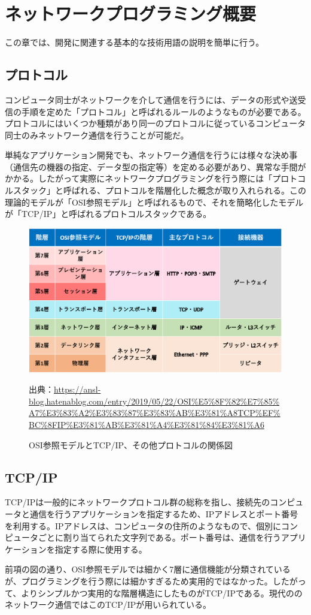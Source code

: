 \documentclass[dvipdfmx]{jsarticle}
\begin{document}
\section{ネットワークプログラミング概要}
この章では、開発に関連する基本的な技術用語の説明を簡単に行う。
\subsection{プロトコル}
コンピュータ同士がネットワークを介して通信を行うには、データの形式や送受信の手順を定めた「プロトコル」と呼ばれるルールのようなものが必要である。プロトコルにはいくつか種類があり同一のプロトコルに従っているコンピュータ同士のみネットワーク通信を行うことが可能だ。\par
単純なアプリケーション開発でも、ネットワーク通信を行うには様々な決め事（通信先の機器の指定、データ型の指定等）を定める必要があり、異常な手間がかかる。したがって実際にネットワークプログラミングを行う際には「プロトコルスタック」と呼ばれる、プロトコルを階層化した概念が取り入れられる。この理論的モデルが「OSI参照モデル」と呼ばれるもので、それを簡略化したモデルが「TCP/IP」と呼ばれるプロトコルスタックである。
\begin{figure}[H]
  \centering
  \includegraphics[scale=0.4]{images/ositcpip.png}
  \caption{OSI参照モデルとTCP/IP、その他プロトコルの関係図}
  出典：\url{https://ansl-blog.hatenablog.com/entry/2019/05/22/OSI%E5%8F%82%E7%85%A7%E3%83%A2%E3%83%87%E3%83%AB%E3%81%A8TCP%EF%BC%8FIP%E3%81%AB%E3%81%A4%E3%81%84%E3%81%A6}
\end{figure}
\subsection{TCP/IP}
TCP/IPは一般的にネットワークプロトコル群の総称を指し、接続先のコンピュータと通信を行うアプリケーションを指定するため、IPアドレスとポート番号を利用する。IPアドレスは、コンピュータの住所のようなもので、個別にコンピュータごとに割り当てられた文字列である。ポート番号は、通信を行うアプリケーションを指定する際に使用する。\par
前項の図の通り、OSI参照モデルでは細かく7層に通信機能が分類されているが、プログラミングを行う際には細かすぎるため実用的ではなかった。したがって、よりシンプルかつ実用的な階層構造にしたものがTCP/IPである。現代ののネットワーク通信ではこのTCP/IPが用いられている。
\end{document}
